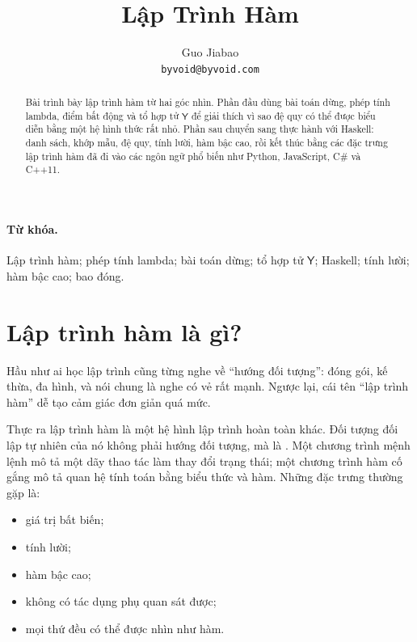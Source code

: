 \documentclass[11pt]{article}
\title{Lập Trình Hàm}
\author{Guo Jiabao\\\texttt{byvoid@byvoid.com}}
\date{}
\newcommand{\Ycomb}{\mathsf{Y}}
\begin{document}
\maketitle


\begin{abstract}
Bài trình bày lập trình hàm từ hai góc nhìn. Phần đầu dùng bài toán dừng,
phép tính lambda, điểm bất động và tổ hợp tử \(\Ycomb\) để giải thích vì sao
đệ quy có thể được biểu diễn bằng một hệ hình thức rất nhỏ. Phần sau chuyển
sang thực hành với Haskell: danh sách, khớp mẫu, đệ quy, tính lười, hàm bậc
cao, rồi kết thúc bằng các đặc trưng lập trình hàm đã đi vào các ngôn ngữ phổ
biến như Python, JavaScript, C\# và C++11.
\end{abstract}

\paragraph{Từ khóa.}
Lập trình hàm; phép tính lambda; bài toán dừng; tổ hợp tử \(\Ycomb\); Haskell;
tính lười; hàm bậc cao; bao đóng.

\tableofcontents

\section{Lập trình hàm là gì?}

Hầu như ai học lập trình cũng từng nghe về ``hướng đối tượng'': đóng gói, kế
thừa, đa hình, và nói chung là nghe có vẻ rất mạnh. Ngược lại, cái tên
``lập trình hàm'' dễ tạo cảm giác đơn giản quá mức.

Thực ra lập trình hàm là một hệ hình lập trình hoàn toàn khác. Đối tượng đối
lập tự nhiên của nó không phải hướng đối tượng, mà là . Một chương trình mệnh lệnh mô tả một dãy thao tác làm thay đổi trạng
thái; một chương trình hàm cố gắng mô tả quan hệ tính toán bằng biểu thức và
hàm. Những đặc trưng thường gặp là:
\begin{itemize}
  \item giá trị bất biến;
  \item tính lười;
  \item hàm bậc cao;
  \item không có tác dụng phụ quan sát được;
  \item mọi thứ đều có thể được nhìn như hàm.
\end{itemize}
\end{document}
